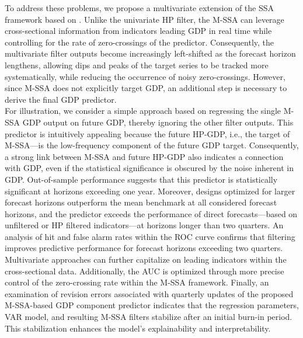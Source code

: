 \documentclass[11pt,a4paper]{article}
\begin{document}
To address these problems, we propose a multivariate extension of the SSA framework based on \cite{Wildi2024}. Unlike the univariate HP filter, the M-SSA can leverage cross-sectional information from indicators leading GDP in real time while controlling for the rate of zero-crossings of the predictor. Consequently, the multivariate filter outputs become increasingly left-shifted as the forecast horizon lengthens, allowing dips and peaks of the target series to be tracked more systematically, while reducing the occurrence of noisy zero-crossings. However, since M-SSA does not explicitly target GDP, an additional step is necessary to derive the final GDP predictor.\\%

For illustration, we consider a simple approach based on regressing the single M-SSA GDP output on future GDP, thereby ignoring the other filter outputs. This predictor is intuitively appealing because the future HP-GDP, i.e., the target of M-SSA—is the low-frequency component of the future GDP target. Consequently, a strong link between M-SSA and future HP-GDP also indicates a connection with GDP, even if the statistical significance is obscured by the noise inherent in GDP. Out-of-sample performance suggests that this predictor is statistically significant at horizons exceeding one year. Moreover, designs optimized for larger forecast horizons outperform the mean benchmark at all considered forecast horizons, and the predictor exceeds the performance of direct forecasts---based on unfiltered or HP filtered indicators---at horizons longer than two quarters. An analysis of hit and false alarm rates within the ROC curve confirms that filtering improves predictive performance for forecast horizons exceeding two quarters. Multivariate approaches can further capitalize on leading indicators within the cross-sectional data. Additionally, the AUC is optimized through more precise control of the zero-crossing rate within the M-SSA framework. Finally, an examination of revision errors associated with quarterly updates of the proposed M-SSA-based GDP component predictor indicates that the regression parameters, VAR model, and resulting M-SSA filters stabilize after an initial burn-in period. This stabilization enhances the model’s explainability and interpretability.\\
\end{document}
